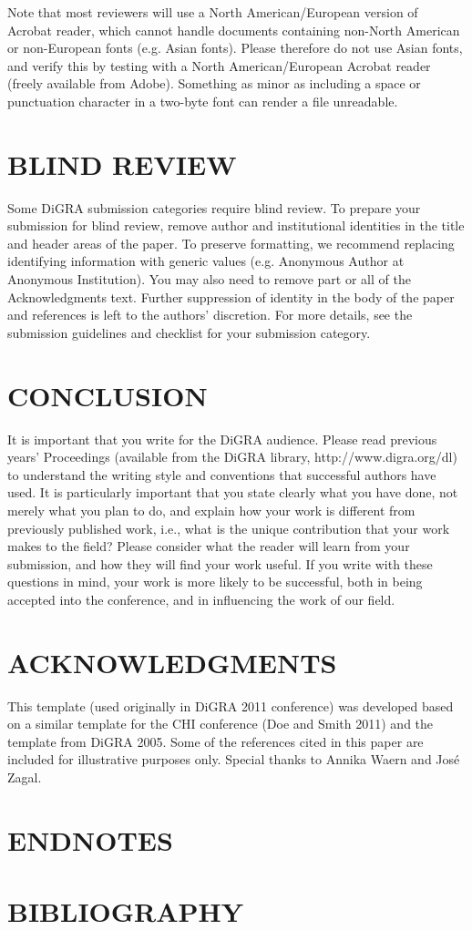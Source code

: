 \documentclass[11pt]{article}
\begin{document}
Note that most reviewers will use a North American/European version of Acrobat reader,
which cannot handle documents containing non-North American or non-European fonts
(e.g. Asian fonts). Please therefore do not use Asian fonts, and verify this by testing with
a North American/European Acrobat reader (freely available from Adobe). Something as
minor as including a space or punctuation character in a two-byte font can render a file
unreadable.
\section*{BLIND REVIEW}
Some DiGRA submission categories require blind review. To prepare your submission
for blind review, remove author and institutional identities in the title and header areas of
the paper. To preserve formatting, we recommend replacing identifying information with
generic values (e.g. Anonymous Author at Anonymous Institution). You may also need to
remove part or all of the Acknowledgments text. Further suppression of identity in the
body of the paper and references is left to the authors' discretion. For more details, see the
submission guidelines and checklist for your submission category.
\section*{CONCLUSION}
It is important that you write for the DiGRA audience. Please read previous years’
Proceedings (available from the DiGRA library, http://www.digra.org/dl) to understand
the writing style and conventions that successful authors have used. It is particularly
important that you state clearly what you have done, not merely what you plan to do, and
explain how your work is different from previously published work, i.e., what is the
unique contribution that your work makes to the field? Please consider what the reader 
will learn from your submission, and how they will find your work useful. If you write
with these questions in mind, your work is more likely to be successful, both in being
accepted into the conference, and in influencing the work of our field.
\section*{ACKNOWLEDGMENTS}
This template (used originally in DiGRA 2011 conference) was developed based on a
similar template for the CHI conference (Doe and Smith 2011) and the template from
DiGRA 2005. Some of the references cited in this paper are included for illustrative
purposes only. Special thanks to Annika Waern and José Zagal.
\section*{ENDNOTES}
\theendnotes

\section*{BIBLIOGRAPHY}
\printbibliography
\end{document}
